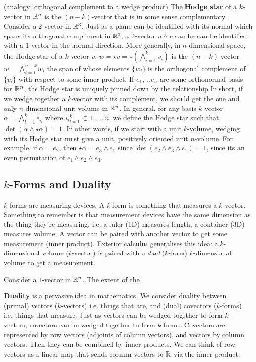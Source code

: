 \begin{definition}
    (analogy: orthogonal complement to a wedge product) The \textbf{Hodge star} of a $k$-vector in $\mathbb{R}^n$ is the $(n-k)$-vector that is in some sense complementary. Consider a $2$-vector in $\mathbb{R}^3$. Just as a plane can be identified with its normal which spans its orthogonal compliment in $\mathbb{R}^3$, a $2$-vector  $u \wedge v$ can be can be identified with a $1$-vector in the normal direction. More generally, in $n$-dimensional space, the Hodge star of a $k$-vector $v$, $w = \star v = \star (\bigwedge_{i=1}^k v_i)$ is the $(n-k)$-vector $w = \bigwedge_{i=1}^{n-k}w_i$ the span of whose elements $\{w_i\}$ is the orthogonal complement of $\{v_i\}$ with respect to some inner product. If $e_1,\dotsc e_n$ are some orthonormal basis for $\mathbb{R}^n$, the Hodge star is uniquely pinned down by the relationship
    In short, if we wedge together a $k$-vector with its complement, we should get the one and only $n$-dimensional unit volume in $\mathbb{R}^n$. In general, for any basis $k$-vector $\alpha = \bigwedge_{l=1}^k e_{i_l}$ where ${i_l}_{l=1}^k \subset {1,\dotsc,n}$, we define the Hodge star such that $\det(\alpha \wedge \star \alpha) = 1$. In other words, if we start with a unit $k$-volume, wedging with its Hodge star must give a unit, positively oriented unit $n$-volume. For example, if $\alpha=e_2$, then $\star \alpha = e_3 \wedge e_1$ since $\det(e_2 \wedge e_3 \wedge e_1) = 1$, since its an even permutation of $e_1 \wedge e_2 \wedge e_3$.
\end{definition}

\subsection{$k$-Forms and Duality}

$k$-forms are measuring devices. A $k$-form is something that measures a $k$-vector. Something to remember is that measurement devices have the same dimension as the thing they're measuring, i.e. a ruler (1D) measures length, a container (3D) measures volume. A vector can be paired with another vector to get some measurement (inner product). Exterior calculus generalises this idea: a $k$-dimensional volume ($k$-vector) is paired with a \textit{dual} ($k$-form) $k$-dimensional volume to get a measurement.

Consider a $1$-vector in $\mathbb{R}^n$. The extent of the 

\textbf{Duality} is a pervasive idea in mathematics. We consider duality between (primal) vectors ($k$-vectors) i.e. things that are, and (dual) covectors ($k$-forms) i.e. things that measure. Just as vectors can be wedged together to form $k$-vectors, covectors can be wedged together to form $k$-forms. Covectors are represented by row vectors (adjoints of column vectors), and vectors by column vectors. Then they can be combined by inner products. We can think of row vectors as a linear map that sends column vectors to $\mathbb{R}$ via the inner product.

